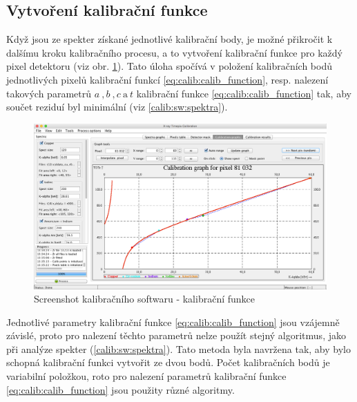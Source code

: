 \subsection{Vytvoření kalibrační funkce}
Když jsou ze spekter získané jednotlivé kalibrační body, je možné přikročit k dalšímu kroku kalibračního procesu, a to vytvoření kalibrační funkce pro každý pixel detektoru (viz obr. \ref{fig:calib:sw_calib_function}). Tato úloha spočívá v položení kalibračních bodů jednotlivých pixelů kalibrační funkcí \ref{eq:calib:calib_function}, resp. nalezení takových parametrů $a~,b~,c~\text{a}~t$ kalibrační funkce \ref{eq:calib:calib_function} tak, aby součet reziduí byl minimální (viz \ref{calib:sw:spektra}).

\begin{figure}[t]
	\begin{center}
		\includegraphics[width=15cm]{figures/calibsw_cc.png}
		\caption{Screenshot kalibračního softwaru - kalibrační funkce}
		\label{fig:calib:sw_calib_function}
	\end{center}
\end{figure}

Jednotlivé parametry kalibrační funkce \ref{eq:calib:calib_function} jsou vzájemně závislé, proto pro nalezení těchto parametrů nelze použít stejný algoritmus, jako při analýze spekter (\ref{calib:sw:spektra}). Tato metoda byla navržena tak, aby bylo schopná kalibrační funkci vytvořit ze dvou bodů. Počet kalibračních bodů je variabilní položkou, roto pro nalezení parametrů kalibrační funkce \ref{eq:calib:calib_function} jsou použity různé algoritmy.


